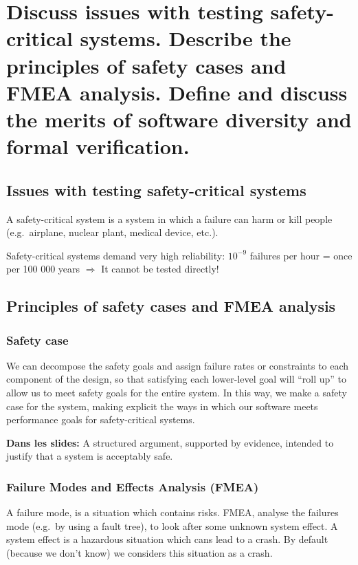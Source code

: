 \clearpage{}
\section{Discuss issues with testing safety-critical systems. Describe the
principles of safety cases and FMEA analysis. Define and discuss the merits
of software diversity and formal verification.}


\subsection{Issues with testing safety-critical systems}
A safety-critical system is a system in which a failure can harm or kill people (e.g.\ airplane, nuclear plant, medical device, etc.). \newline

Safety-critical systems demand very high reliability:
${10}^{-9}$ failures per hour = once per 100 000 years \newline
$\Rightarrow$ It cannot be tested directly!

\subsection{Principles of safety cases and FMEA analysis}

\subsubsection{Safety case}
We can decompose the safety goals and assign failure rates or constraints to each
component of the design, so that satisfying each lower-level goal will “roll up” to allow us to meet safety goals for the entire system. In this way, we make a safety case for the system, making explicit the ways in which our software meets performance goals for safety-critical systems. \newline

\textbf{Dans les slides:} A structured argument, supported by evidence, intended to justify that a system is acceptably safe. \newline

\subsubsection{Failure Modes and Effects Analysis (FMEA)}

A failure mode, is a situation which contains risks.
FMEA, analyse the failures mode (e.g.\ by using a fault tree), to look after some
unknown system effect. A system effect is a hazardous situation which cans lead to a crash. By default (because we don’t know) we considers this situation as a crash. \newline

